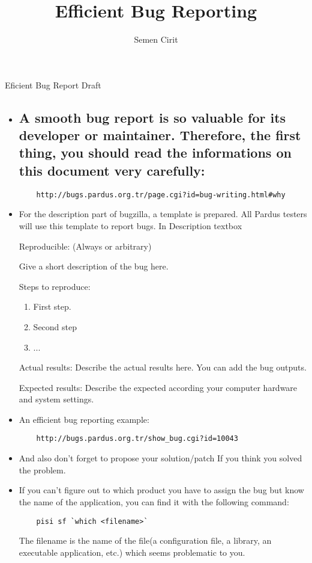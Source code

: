 \documentclass[a4paper,10pt]{article}
\title{Efficient Bug Reporting}
\author{Semen Cirit}
\begin{document}
\maketitle

Eficient Bug Report Draft

\begin{itemize}
 
  	\item \subsection*{A smooth bug report is so valuable for its developer or maintainer. Therefore, the first thing, you should read the informations on this document very carefully:}
	\begin{verbatim} 
 	http://bugs.pardus.org.tr/page.cgi?id=bug-writing.html#why
	\end{verbatim}

  	\item For the description part of bugzilla, a template is prepared. All Pardus testers will use this template to report bugs.
  	In Description textbox

   	Reproducible: (Always or arbitrary)	
   
    	Give a short description of the bug here.
   
   	Steps to reproduce:
   	\begin{enumerate}
    	\item First step.
    	\item Second step
    	\item ...
   	\end{enumerate}

	Actual results:
	Describe the actual results here. You can add the bug outputs.
	
	Expected results:
	Describe the expected according your computer hardware and system settings.
	
	\item An efficient bug reporting example:
	\begin{verbatim}
	http://bugs.pardus.org.tr/show_bug.cgi?id=10043
	\end{verbatim}
	\item And also don't forget to propose your solution/patch If you think you solved the problem.

  	\item If you can't figure out to which product you have to assign the bug but know the name of the application, you can find it with the following command:
	\begin{verbatim}
	pisi sf `which <filename>`
	\end{verbatim}
	The filename is the name of the file(a configuration file, a library, an executable application, etc.) which seems problematic to you.


\end{itemize}
\end{document}
